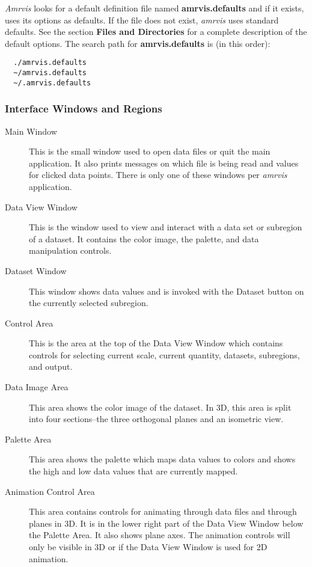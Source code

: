 {\em Amrvis} looks for a default definition file named  {\bf amrvis.defaults}
and if it exists, uses its options as defaults.
If the file does not exist, {\em amrvis} uses standard defaults.
See the section {\bf Files and Directories} for a complete description
of the default options.
The search path for {\bf amrvis.defaults} is (in this order):

\begin{verbatim}
  ./amrvis.defaults
  ~/amrvis.defaults
  ~/.amrvis.defaults
\end{verbatim}



\subsubsection{Interface Windows and Regions}

\begin{description}
\item[Main Window]  This is the small window used to open data files
or quit the main application.  It also prints messages on which file
is being read and values for clicked data points.  There is only one
of these windows per {\em amrvis} application.

\item[Data View Window]  This is the window used to view and interact
with a data set or subregion of a dataset.  It contains the color image,
the palette, and data manipulation controls.

\item[Dataset Window]  This window shows data values and is invoked
with the Dataset button on the currently selected subregion.

\item[Control Area]  This is the area at the top of the Data View Window
which contains controls for selecting current scale, current quantity,
datasets, subregions, and output.

\item[Data Image Area]  This area shows the color image of the dataset.
In 3D, this area is split into four sections--the three orthogonal
planes and an isometric view.

\item[Palette Area]  This area shows the palette which maps data values
to colors and shows the high and low data values that are currently mapped.

\item[Animation Control Area]  This area contains controls for animating
through data files and through planes in 3D.  It is in the lower right
part of the Data View Window below the Palette Area.  It also shows
plane axes.  The animation controls will only be visible in 3D or
if the Data View Window is used for 2D animation.
\end{description}


